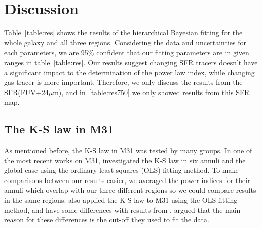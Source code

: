 \documentclass[useAMS,usenatbib]{mn2e}
\begin{document}
%
\section{Discussion}

Table~\ref{table:res} shows the results of the hierarchical Bayesian fitting for the whole galaxy and all three regions. Considering the data and uncertainties for each parameters, we are 95$\%$ confident that our fitting parameters are in given ranges in table~\ref{table:res}. Our results suggest changing SFR tracers doesn't have a significant impact to the determination of the power law index, while changing gas tracer is more important. Therefore, we only discuss the results from the SFR(FUV+24$\mu$m), and in~\ref{table:res750} we only showed results from this SFR map.

\subsection{The K-S law in M31}

As mentioned before, the K-S law in M31 was tested by many groups. In one of the most recent works on M31, \cite{Ford13} investigated the K-S law in six annuli and the global case using the ordinary least squares (OLS) fitting method. To make comparisons between our results easier, we averaged the power indices for their annuli which overlap with our three different regions so we could compare results in the same regions.
\cite{Tabatabaei10} also applied the K-S law to M31 using the OLS fitting method, and have some differences with results from \cite{Ford13}. \cite{Ford13} argued that the main reason for these differences is the cut-off they used to fit the data. 
 
\end{document}

